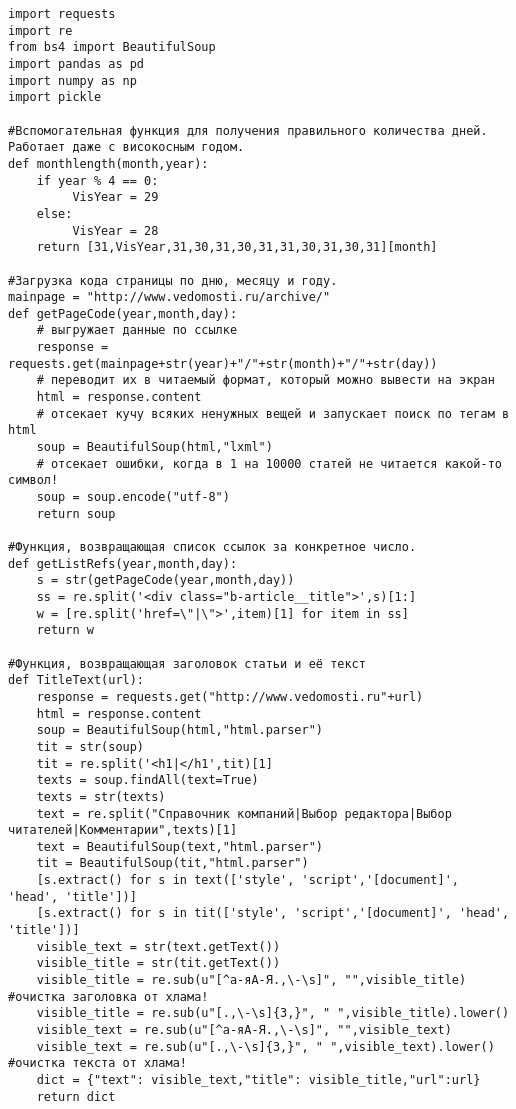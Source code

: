 \documentclass[14pt,a4paper, oneside]{extreport}
\begin{document}
\begin{verbatim}
import requests
import re
from bs4 import BeautifulSoup
import pandas as pd
import numpy as np
import pickle

#Вспомогательная функция для получения правильного количества дней. Работает даже с високосным годом.
def monthlength(month,year):
    if year % 4 == 0:
         VisYear = 29
    else:
         VisYear = 28
    return [31,VisYear,31,30,31,30,31,31,30,31,30,31][month]

#Загрузка кода страницы по дню, месяцу и году.
mainpage = "http://www.vedomosti.ru/archive/"
def getPageCode(year,month,day):
    # выгружает данные по ссылке
    response = requests.get(mainpage+str(year)+"/"+str(month)+"/"+str(day))                                      
    # переводит их в читаемый формат, который можно вывести на экран    
    html = response.content           
    # отсекает кучу всяких ненужных вещей и запускает поиск по тегам в html     
    soup = BeautifulSoup(html,"lxml")   
    # отсекает ошибки, когда в 1 на 10000 статей не читается какой-то символ!
    soup = soup.encode("utf-8")       
    return soup       

#Функция, возвращающая список ссылок за конкретное число.
def getListRefs(year,month,day):
    s = str(getPageCode(year,month,day))
    ss = re.split('<div class="b-article__title">',s)[1:]
    w = [re.split('href=\"|\">',item)[1] for item in ss]
    return w

#Функция, возвращающая заголовок статьи и её текст
def TitleText(url):
    response = requests.get("http://www.vedomosti.ru"+url)
    html = response.content
    soup = BeautifulSoup(html,"html.parser")
    tit = str(soup)
    tit = re.split('<h1|</h1',tit)[1]
    texts = soup.findAll(text=True)
    texts = str(texts)
    text = re.split("Справочник компаний|Выбор редактора|Выбор читателей|Комментарии",texts)[1]
    text = BeautifulSoup(text,"html.parser")
    tit = BeautifulSoup(tit,"html.parser")
    [s.extract() for s in text(['style', 'script','[document]', 'head', 'title'])]
    [s.extract() for s in tit(['style', 'script','[document]', 'head', 'title'])]
    visible_text = str(text.getText())
    visible_title = str(tit.getText())    
    visible_title = re.sub(u"[^а-яА-Я.,\-\s]", "",visible_title) #очистка заголовка от хлама!
    visible_title = re.sub(u"[.,\-\s]{3,}", " ",visible_title).lower()    
    visible_text = re.sub(u"[^а-яА-Я.,\-\s]", "",visible_text)   
    visible_text = re.sub(u"[.,\-\s]{3,}", " ",visible_text).lower() #очистка текста от хлама!  
    dict = {"text": visible_text,"title": visible_title,"url":url}
    return dict


\end{verbatim}
\end{document}
